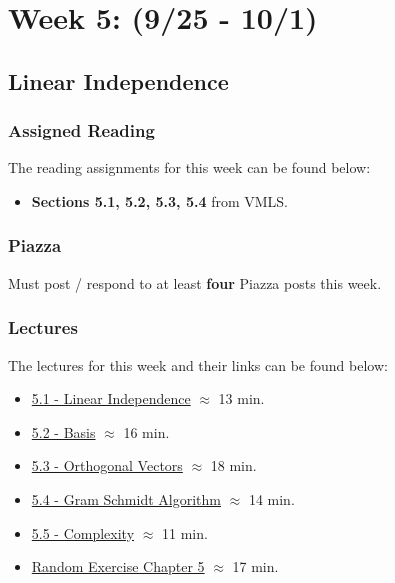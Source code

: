 \clearpage
\chapter{Week 5: (9/25 - 10/1)}

\section{Linear Independence}

\subsection{Assigned Reading}

The reading assignments for this week can be found below:

\begin{itemize}
    \item \textbf{Sections 5.1, 5.2, 5.3, 5.4} from VMLS.
\end{itemize}

\subsection{Piazza}

Must post / respond to at least \textbf{four} Piazza posts this week.  

\subsection{Lectures}

The lectures for this week and their links can be found below:

\begin{itemize}
    \item \href{https://applied.cs.colorado.edu/mod/hvp/view.php?id=50717}{5.1 - Linear Independence} $\approx$ 13 min.
    \item \href{https://applied.cs.colorado.edu/mod/hvp/view.php?id=50718}{5.2 - Basis} $\approx$ 16 min.
    \item \href{https://applied.cs.colorado.edu/mod/hvp/view.php?id=50719}{5.3 - Orthogonal Vectors} $\approx$ 18 min.
    \item \href{https://applied.cs.colorado.edu/mod/hvp/view.php?id=50720}{5.4 - Gram Schmidt Algorithm} $\approx$ 14 min.
    \item \href{https://applied.cs.colorado.edu/mod/hvp/view.php?id=50721}{5.5 - Complexity} $\approx$ 11 min.
    \item \href{https://applied.cs.colorado.edu/mod/hvp/view.php?id=50722}{Random Exercise Chapter 5} $\approx$ 17 min.
\end{itemize}

